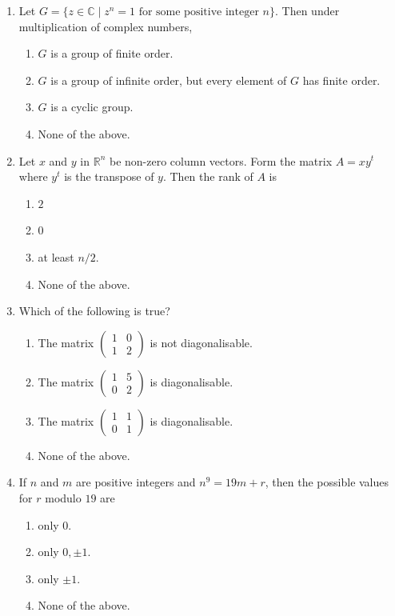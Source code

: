 \documentclass[11pt, a4paper]{article}
\begin{document}
\begin{enumerate}
  \item Let $G = \{z \in \mathbb{C} \mid z^n = 1 \text{ for some positive integer } n\}$. Then under multiplication of complex numbers,
  \begin{enumerate}[label=(\alph*)]
    \item $G$ is a group of finite order.
    \item $G$ is a group of infinite order, but every element of $G$ has finite order.
    \item $G$ is a cyclic group.
    \item None of the above.
  \end{enumerate}

  \item Let $x$ and $y$ in $\mathbb{R}^n$ be non-zero column vectors. Form the matrix $A = x y^t$ where $y^t$ is the transpose of $y$. Then the rank of $A$ is
  \begin{enumerate}[label=(\alph*)]
    \item $2$
    \item $0$
    \item at least $n/2$.
    \item None of the above.
  \end{enumerate}

  \item Which of the following is true?
  \begin{enumerate}[label=(\alph*)]
    \item The matrix $\begin{pmatrix} 1 & 0 \\ 1 & 2 \end{pmatrix}$ is not diagonalisable.
    \item The matrix $\begin{pmatrix} 1 & 5 \\ 0 & 2 \end{pmatrix}$ is diagonalisable.
    \item The matrix $\begin{pmatrix} 1 & 1 \\ 0 & 1 \end{pmatrix}$ is diagonalisable.
    \item None of the above.
  \end{enumerate}

  \item If $n$ and $m$ are positive integers and $n^9 = 19m + r$, then the possible values for $r$ modulo $19$ are
  \begin{enumerate}[label=(\alph*)]
    \item only $0$.
    \item only $0, \pm 1$.
    \item only $\pm 1$.
    \item None of the above.
  \end{enumerate}


\end{enumerate}
\end{document}
